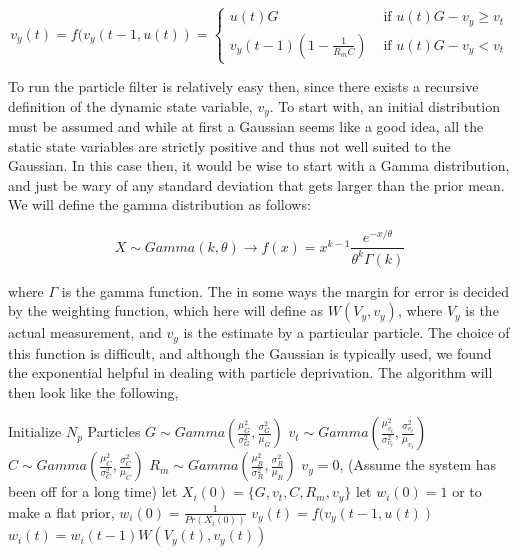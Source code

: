 \documentclass{article}
\begin{document}
\begin{equation}
v_y(t)  = f(v_y(t-1, u(t)) =  \begin{cases} 
        u(t)G & \text{ if }  u(t)G-v_y \ge v_t\\
        v_y(t-1)\left(1 - \frac{1}{R_mC}\right) & \text{ if }  u(t)G-v_y < v_t
    \end{cases} 
\end{equation}

To run the particle filter is relatively easy then, since there exists 
a recursive definition of the dynamic state variable, $v_y$. To start
with, an initial distribution must be assumed and while at first a 
Gaussian seems like a good idea, all the static state variables are strictly
positive and thus not well suited to the Gaussian. In this case then,
it would be wise to start with a Gamma distribution, and just be wary of
any standard deviation that gets larger than the prior mean. We will define
the gamma distribution as follows:

\begin{equation}
X \sim Gamma(k, \theta) \rightarrow f(x) = x^{k-1}\frac{e^{-x/\theta}}{\theta^k\Gamma(k)}
\end{equation}

where $\Gamma$ is the gamma function.
The in some ways the margin for error is decided by the weighting function, which
here will define as $W(V_y, v_y)$, where $V_y$ is the actual measurement, and 
$v_y$ is the estimate by a particular particle. The choice of this function is difficult,
and although the Gaussian is typically used, we found the exponential helpful
in dealing with particle deprivation.  The algorithm will then look like the following,

\begin{algorithmic}
\STATE Initialize $N_p$ Particles
    \STATE $G \sim Gamma(\frac{\mu^2_G}{\sigma^2_G}, \frac{\sigma^2_G}{\mu_G})$
    \STATE $v_t \sim Gamma(\frac{\mu^2_{v_t}}{\sigma^2_{v_t}}, \frac{\sigma^2_{v_t}}{\mu_{v_t}})$
    \STATE $C \sim Gamma(\frac{\mu^2_C}{\sigma^2_C}, \frac{\sigma^2_C}{\mu_C})$
    \STATE $R_m \sim Gamma(\frac{\mu^2_R}{\sigma^2_R}, \frac{\sigma^2_R}{\mu_R})$
    \STATE $v_y = 0$, (Assume the system has been off for a long time)
    \STATE let $X_i(0) = \{G, v_t, C, R_m, v_y\}$
    \STATE let $w_i(0) = 1$ or to make a flat prior, $w_i(0) = \frac{1}{Pr(X_i(0))}$ 
\ENDFOR
{}
        \STATE $v_y(t) = f(v_y(t-1, u(t))$
        \STATE $w_i(t) = w_i(t-1)W(V_y(t), v_y(t))$
    \ENDFOR
\ENDFOR

\end{algorithmic}
\end{document}
